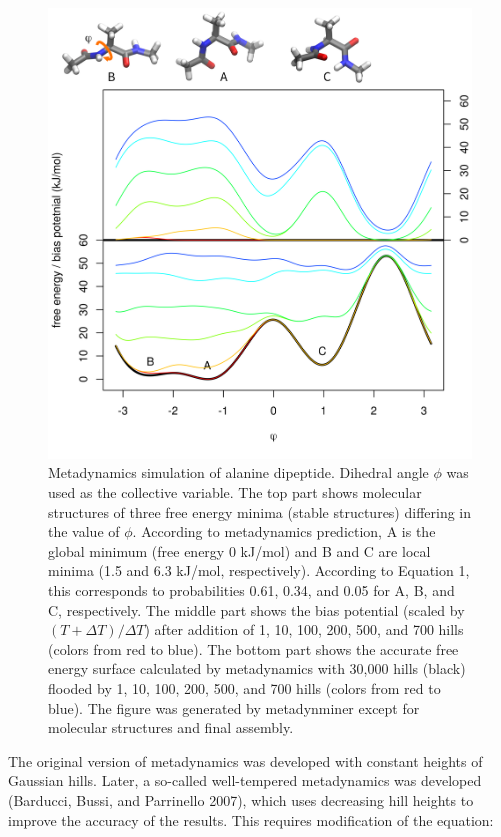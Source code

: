 \begin{figure}

{\centering \includegraphics[width=0.8\linewidth]{fig1} 

}

\caption{Metadynamics simulation of alanine dipeptide. Dihedral angle $\phi$ was used as the collective variable. The top part shows molecular structures of three free energy minima (stable structures) differing in the value of $\phi$. According to metadynamics prediction, A is the global minimum (free energy 0 kJ/mol) and B and C are local minima (1.5 and 6.3 kJ/mol, respectively). According to Equation 1, this corresponds to probabilities 0.61, 0.34, and 0.05 for A, B, and C, respectively. The middle part shows the bias potential (scaled by $(T+\Delta T)/\Delta T$) after addition of 1, 10, 100, 200, 500, and 700 hills (colors from red to blue). The bottom part shows the accurate free energy surface calculated by metadynamics with 30,000 hills (black) flooded by 1, 10, 100, 200, 500, and 700 hills (colors from red to blue). The figure was generated by metadynminer except for molecular structures and final assembly.}\label{fig:Metadynamics}
\end{figure}

The original version of metadynamics was developed with constant heights of Gaussian hills.
Later, a so-called well-tempered metadynamics was developed (Barducci, Bussi, and Parrinello 2007), which uses
decreasing hill heights to improve the accuracy of the results. This requires modification
of the equation:


